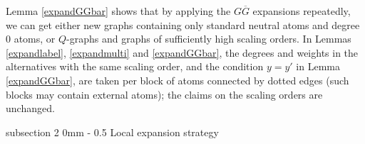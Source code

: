 \documentclass{article}
\makeatletter
\newcommand{\1}{\mathds{1}}
\numberwithin{equation}{section}
\theoremstyle{plain} %
\theoremstyle{remark}
\renewcommand{\subsection}{\@startsection
{subsection}%
{2}%
{0mm}%
{-\baselineskip}%
{0.5\baselineskip}%
{\normalfont\bf\itshape}} %
\makeatother
\begin{document}
Lemma \ref{expandGGbar} shows that by applying the $G\overline G$ expansions repeatedly, we can get either new graphs containing only standard neutral atoms and degree 0 atoms, or $Q$-graphs and graphs of sufficiently high scaling orders.
In Lemmas \ref{expandlabel}, \ref{expandmulti} and \ref{expandGGbar}, the degrees and weights in the alternatives with the same scaling order, and the condition $y=y'$ in Lemma \ref{expandGGbar}, are taken per block of atoms connected by dotted edges (such blocks may contain external atoms); the claims on the scaling orders are unchanged.



\subsection{Local expansion strategy} 

\end{document}
